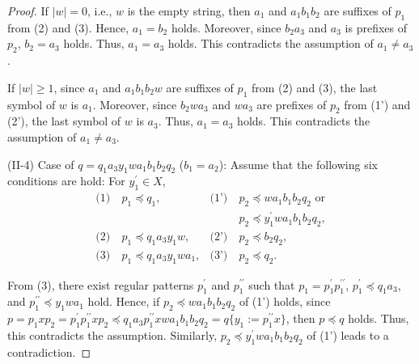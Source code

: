 \begin{proof}
If $|w|=0$, i.e., $w$ is the empty string, then $a_{1}$ and $a_{1}b_{1}b_{2}$ are suffixes of $p_{1}$ from (2) and (3).
Hence, $a_{1}=b_{2}$ holds.
Moreover, since $b_{2}a_{3}$ and $a_{3}$ is prefixes of $p_{2}$, $b_{2}=a_{3}$ holds.
Thus, $a_{1}=a_{3}$ holds.
This contradicts the assumption of $a_{1} \ne a_{3}$.

If $|w| \ge 1$, since $a_{1}$ and $a_{1}b_{1}b_{2}w$ are suffixes of $p_{1}$ from (2) and (3),
the last symbol of $w$ is $a_{1}$.
Moreover, since $b_{2}wa_{3}$ and $wa_{3}$ are prefixes of $p_{2}$ from (1') and (2'),
the last symbol of $w$ is $a_{3}$.
Thus, $a_{1}=a_{3}$ holds.
This contradicts the assumption of $a_{1} \ne a_{3}$.
\smallskip

\noindent
(II-4) Case of $q=q_{1}a_{3}y_{1}wa_{1}b_{1}b_{2}q_{2}$ ($b_{1}=a_{2}$):
Assume that the following six conditions are hold: For $y_{1}^{\prime} \in X$,
\begin{align*}
\textrm{(1)}~& p_{1} \preceq q_{1}, & \textrm{(1')}~& p_{2} \preceq wa_{1}b_{1}b_{2}q_{2} \mbox{ or} \\
& & & p_{2} \preceq y_{1}^{\prime}wa_{1}b_{1}b_{2}q_{2},\\
\textrm{(2)}~& p_{1} \preceq q_{1}a_{3}y_{1}w, & \textrm{(2')}~& p_{2} \preceq b_{2}q_{2}, \\
\textrm{(3)}~& p_{1} \preceq q_{1}a_{3}y_{1}wa_{1}, & \textrm{(3')}~& p_{2} \preceq q_{2}.
\end{align*}

\noindent
From (3), there exist regular patterns $p_{1}^{\prime}$ and $p_{1}^{\prime\prime}$ such that $p_{1}=p_{1}^{\prime}p_{1}^{\prime\prime}$, $p_{1}^{\prime} \preceq q_{1}a_{3}$, and $p_{1}^{\prime\prime} \preceq y_{1}wa_{1}$ hold.
Hence, if $p_{2} \preceq wa_{1}b_{1}b_{2}q_{2}$ of (1') holds, since $p=p_{1}xp_{2}=p_{1}^{\prime}p_{1}^{\prime\prime}xp_{2}\preceq q_{1}a_{3}p_{1}^{\prime\prime}xwa_{1}b_{1}b_{2}q_{2}=q \{ y_{1} := p_{1}^{\prime\prime}x \}$, then $p \preceq q$ holds.
Thus, this contradicts the assumption.
Similarly, $p_{2} \preceq y_{1}^{\prime}wa_{1}b_{1}b_{2}q_{2}$ of (1') leads to a contradiction.

\smallskip


\end{proof}
